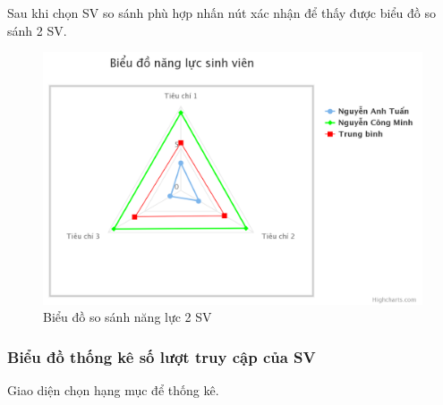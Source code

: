Sau khi chọn SV so sánh phù hợp nhấn nút xác nhận để thấy được biểu đồ so sánh 2 SV.
\begin{center}
	\begin{figure}[htp]
		\begin{center}
			\includegraphics[width=0.8\linewidth]{img/25}
		\end{center}
		\caption{Biểu đồ so sánh năng lực 2 SV}
		\label{refhinh57}
	\end{figure}
\end{center}


\newpage
\subsubsection*{Biểu đồ thống kê số lượt truy cập của SV}

Giao diện chọn hạng mục để thống kê.

